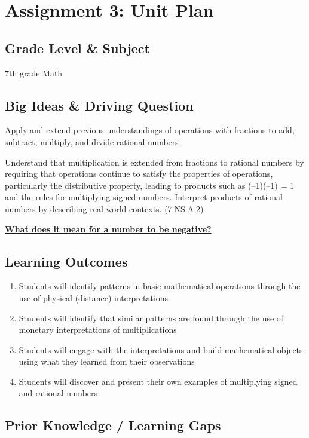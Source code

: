 \documentclass{notes}
\begin{document}
\section*{Assignment 3: Unit Plan}

\subsection*{Grade Level \& Subject}

7th grade Math

\subsection*{Big Ideas \& Driving Question}

Apply and extend previous understandings of operations with fractions to add, subtract, multiply, and divide rational numbers

Understand that multiplication is extended from fractions to rational numbers by requiring that operations continue to satisfy the properties of operations, particularly the distributive property, leading to products such as (–1)(–1) = 1 and the rules for multiplying signed numbers. Interpret products of rational numbers by describing real-world contexts. (7.NS.A.2)

\textbf{\ul{What does it mean for a number to be negative?}}

\subsection*{Learning Outcomes}

\begin{enumerate}
    \item Students will identify patterns in basic mathematical operations through the use of physical (distance) interpretations
    \item Students will identify that similar patterns are found through the use of monetary interpretations of multiplications
    \item Students will engage with the interpretations and build mathematical objects using what they learned from their observations
    \item Students will discover and present their own examples of multiplying signed and rational numbers
\end{enumerate}

\subsection*{Prior Knowledge / Learning Gaps}
\end{document}
